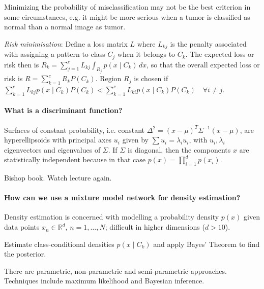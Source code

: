 Minimizing the probability of misclassification may not be the best
criterion in some circumstances, e.g. it might be more serious when a
tumor is classified as normal than a normal image as tumor.

\textit{Risk minimisation}: Define a loss matrix $L$
where $L_{kj}$ is the penalty associated with assigning a pattern to class $C_j$ when it belongs to $C_k$.
The expected loss or risk then is $R_k = \sum_{j=1}^c{L_{kj}} \int_{R_j}{ p(x \mid C_k) \, dx }$,
so that the overall expected loss or risk is $R = \sum_{k=1}^c{ R_k P(C_k) }$.
Region $R_j$ is chosen if $\sum_{k=1}^c{L_{kj} p(x \mid C_k) P(C_k) } < \sum_{k=1}^c{L_{ki} p(x \mid C_k) P(C_k) } \quad \forall i \neq j$.

\paragraph{What is a discriminant function?}

Surfaces of constant probability, i.e. constant $\Delta^2 = (x - \mu)^T \Sigma^{-1} (x - \mu)$,
are hyperellipsoids with principal axes $u_i$ given by $\sum{u_i} = \lambda_i u_i$,
with $u_i, \lambda_i$ eigenvectors and eigenvalues of $\Sigma$.
If $\Sigma$ is diagonal, then the components $x$ are statistically independent because in that case $p(x) = \prod_{i=1}^d{p(x_i)}$.

Bishop book. Watch lecture again.

\paragraph{How can we use a mixture model network for density estimation?}

Density estimation is concerned with modelling a probability density $p(x)$ given data points $x_n \in \mathbb{R}^d, \, n = 1, \dots, N$;
difficult in higher dimensions ($d > 10$).

Estimate class-conditional densities $p(x \mid C_k)$ and apply Bayes' Theorem to find the posterior.

There are parametric, non-parametric and semi-parametric approaches.
Techniques include maximum likelihood and Bayesian inference.

